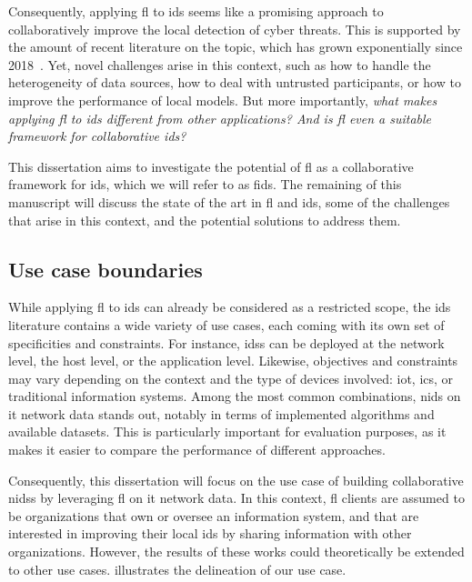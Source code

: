 Consequently, applying \gls{fl} to \gls{ids} seems like a promising approach to collaboratively improve the local detection of cyber threats.
This is supported by the amount of recent literature on the topic, which has grown exponentially since 2018~\cite{lavaur_EvolutionFederatedLearningbased_2022,ismaila_ReviewApproachesFederated_2024}.
Yet, novel challenges arise in this context, such as how to handle the heterogeneity of data sources, how to deal with untrusted participants, or how to improve the performance of local models.
But more importantly, \emph{what makes applying \gls{fl} to \gls{ids} different from other applications? And is \gls{fl} even a suitable framework for collaborative \gls{ids}?}

This dissertation aims to investigate the potential of \acrlong{fl} as a collaborative framework for \acrlong{ids}, which we will refer to as \gls{fids}.
The remaining of this manuscript will discuss the state of the art in \gls{fl} and \gls{ids}, some of the challenges that arise in this context, and the potential solutions to address them.


\subsection{Use case boundaries\label{sec:intro.context.usecase}}

While applying \gls{fl} to \gls{ids} can already be considered as a restricted scope, the \gls{ids} literature contains a wide variety of use cases, each coming with its own set of specificities and constraints.
For instance, \glspl{ids} can be deployed at the network level, the host level, or the application level.
Likewise, objectives and constraints may vary depending on the context and the type of devices involved: \gls{iot}, \gls{ics}, or traditional information systems.
Among the most common combinations, \gls{nids} on \gls{it} network data stands out, notably in terms of implemented algorithms and available datasets.
This is particularly important for evaluation purposes, as it makes it easier to compare the performance of different approaches.

Consequently, this dissertation will focus on the use case of building collaborative \glspl{nids} by leveraging \gls{fl} on \gls{it} network data.
In this context, \gls{fl} clients are assumed to be organizations that own or oversee an information system, and that are interested in improving their local \gls{ids} by sharing information with other organizations.
However, the results of these works could theoretically be extended to other use cases.
 illustrates the delineation of our use case.

